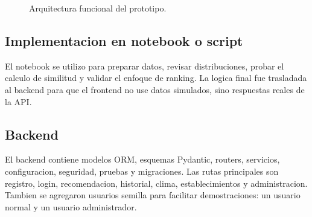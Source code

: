 \documentclass[12pt,a4paper]{article}
\begin{document}
\begin{figure}[H]
\centering
{}
\caption{Arquitectura funcional del prototipo.}
\label{fig:arquitectura}
\end{figure}

\subsection{Implementacion en notebook o script}
El notebook se utilizo para preparar datos, revisar distribuciones, probar el calculo de similitud y validar el enfoque de ranking. La logica final fue trasladada al backend para que el frontend no use datos simulados, sino respuestas reales de la API.

\subsection{Backend}
El backend contiene modelos ORM, esquemas Pydantic, routers, servicios, configuracion, seguridad, pruebas y migraciones. Las rutas principales son registro, login, recomendacion, historial, clima, establecimientos y administracion. Tambien se agregaron usuarios semilla para facilitar demostraciones: un usuario normal y un usuario administrador.
\end{document}
